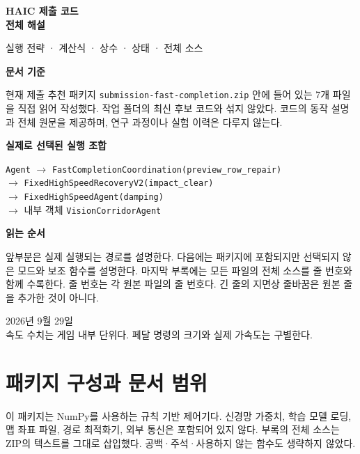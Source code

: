 \documentclass[11pt,a4paper]{article}
\newcommand{\code}[1]{{\small\nolinkurl{#1}}}
\begin{document}
\begin{titlepage}
\vspace*{18mm}
{\Huge\bfseries\color{navy} HAIC 제출 코드\\[4mm]전체 해설}\par
\vspace{8mm}
{\Large 실행 전략 · 계산식 · 상수 · 상태 · 전체 소스}
\vspace{14mm}

\textbf{문서 기준}\par
현재 제출 추천 패키지 \code{submission-fast-completion.zip} 안에 들어 있는 7개 파일을 직접 읽어 작성했다. 작업 폴더의 최신 후보 코드와 섞지 않았다. 코드의 동작 설명과 전체 원문을 제공하며, 연구 과정이나 실험 이력은 다루지 않는다.

\textbf{실제로 선택된 실행 조합}\par
\code{Agent} $\rightarrow$ \code{FastCompletionCoordination(preview_row_repair)}\\
$\rightarrow$ \code{FixedHighSpeedRecoveryV2(impact_clear)}\\
$\rightarrow$ \code{FixedHighSpeedAgent(damping)}\\
$\rightarrow$ 내부 객체 \code{VisionCorridorAgent}

\textbf{읽는 순서}\par
앞부분은 실제 실행되는 경로를 설명한다. 다음에는 패키지에 포함되지만 선택되지 않은 모드와 보조 함수를 설명한다. 마지막 부록에는 모든 파일의 전체 소스를 줄 번호와 함께 수록한다. 줄 번호는 각 원본 파일의 줄 번호다. 긴 줄의 지면상 줄바꿈은 원본 줄을 추가한 것이 아니다.

\vfill
2026년 9월 29일\\
속도 수치는 게임 내부 단위다. 페달 명령의 크기와 실제 가속도는 구별한다.
\end{titlepage}
\renewcommand{\contentsname}{목차}\tableofcontents\newpage

\section{패키지 구성과 문서 범위}
이 패키지는 NumPy를 사용하는 규칙 기반 제어기다. 신경망 가중치, 학습 모델 로딩, 맵 좌표 파일, 경로 최적화기, 외부 통신은 포함되어 있지 않다. 부록의 전체 소스는 ZIP의 텍스트를 그대로 삽입했다. 공백·주석·사용하지 않는 함수도 생략하지 않았다.
\end{document}
